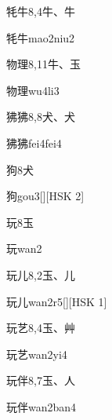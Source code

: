 \begin{entry}{牦牛}{8,4}{⽜、⽜}
  \begin{phonetics}{牦牛}{mao2niu2}
  \end{phonetics}
\end{entry}

\begin{entry}{物理}{8,11}{⽜、⽟}
  \begin{phonetics}{物理}{wu4li3}
  \end{phonetics}
\end{entry}

\begin{entry}{狒狒}{8,8}{⽝、⽝}
  \begin{phonetics}{狒狒}{fei4fei4}
  \end{phonetics}
\end{entry}

\begin{entry}{狗}{8}{⽝}
  \begin{phonetics}{狗}{gou3}[][HSK 2]
  \end{phonetics}
\end{entry}

\begin{entry}{玩}{8}{⽟}
  \begin{phonetics}{玩}{wan2}
  \end{phonetics}
\end{entry}

\begin{entry}{玩儿}{8,2}{⽟、⼉}
  \begin{phonetics}{玩儿}{wan2r5}[][HSK 1]
  \end{phonetics}
\end{entry}

\begin{entry}{玩艺}{8,4}{⽟、⾋}
  \begin{phonetics}{玩艺}{wan2yi4}
  \end{phonetics}
\end{entry}

\begin{entry}{玩伴}{8,7}{⽟、⼈}
  \begin{phonetics}{玩伴}{wan2ban4}
  \end{phonetics}
\end{entry}

